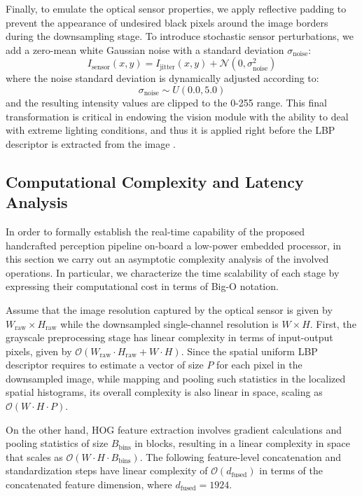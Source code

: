 Finally, to emulate the optical sensor properties, we apply reflective padding to prevent the appearance of undesired black pixels around the image borders during the downsampling stage. To introduce stochastic sensor perturbations, we add a zero-mean white Gaussian noise with a standard deviation $\sigma_{\text{noise}}$:
\begin{equation} 
I_{\text{sensor}}(x,y) = I_{\text{jitter}}(x,y) + \mathcal{N}(0, \sigma_{\text{noise}}^2) \label{eq:noise_sensor} 
\end{equation}
where the noise standard deviation is dynamically adjusted according to:
\begin{equation} 
\sigma_{\text{noise}} \sim U(0.0, 5.0) \label{eq:noise_sigma} 
\end{equation}
and the resulting intensity values are clipped to the 0-255 range. This final transformation is critical in endowing the vision module with the ability to deal with extreme lighting conditions, and thus it is applied right before the LBP descriptor is extracted from the image \cite{ojala2002multiresolution}.

\subsection{Computational Complexity and Latency Analysis}

In order to formally establish the real-time capability of the proposed handcrafted perception pipeline on-board a low-power embedded processor, in this section we carry out an asymptotic complexity analysis of the involved operations. In particular, we characterize the time scalability of each stage by expressing their computational cost in terms of Big-O notation.

Assume that the image resolution captured by the optical sensor is given by $W_{\text{raw}} \times H_{\text{raw}}$ while the downsampled single-channel resolution is $W \times H$. First, the grayscale preprocessing stage has linear complexity in terms of input-output pixels, given by $\mathcal{O}(W_{\text{raw}} \cdot H_{\text{raw}} + W \cdot H)$. Since the spatial uniform LBP descriptor requires to estimate a vector of size $P$ for each pixel in the downsampled image, while mapping and pooling such statistics in the localized spatial histograms, its overall complexity is also linear in space, scaling as $\mathcal{O}(W \cdot H \cdot P)$.

On the other hand, HOG feature extraction involves gradient calculations and pooling statistics of size $B_{\text{bins}}$ in blocks, resulting in a linear complexity in space that scales as $\mathcal{O}(W \cdot H \cdot B_{\text{bins}})$. The following feature-level concatenation and standardization steps have linear complexity of $\mathcal{O}(d_{\text{fused}})$ in terms of the concatenated feature dimension, where $d_{\text{fused}} = 1924$. 

